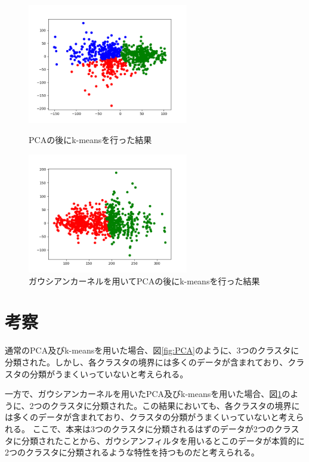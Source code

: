 \documentclass[a4paper,11pt]{jsarticle}
\begin{document}
\begin{figure}[h]
  \begin{minipage}
    {0.5\hsize}
    \begin{center}
      \includegraphics[width=7cm]{pca_and_kmeans.png}
    \end{center}
    \caption{PCAの後にk-meansを行った結果}
    \label{fig:PCA}
  \end{minipage}
  \begin{minipage}
    {0.5\hsize}
    \begin{center}
      \includegraphics[width=7cm]{kernel_pca_and_kmeans.png}
    \end{center}
    \caption{ガウシアンカーネルを用いてPCAの後にk-meansを行った結果}
    \label{fig:PCA_gaussian}
  \end{minipage}
\end{figure}

\section{考察}
通常のPCA及びk-meansを用いた場合、図\ref{fig:PCA}のように、3つのクラスタに分類された。しかし、各クラスタの境界には多くのデータが含まれており、クラスタの分類がうまくいっていないと考えられる。

一方で、ガウシアンカーネルを用いたPCA及びk-meansを用いた場合、図\ref{fig:PCA_gaussian}のように、2つのクラスタに分類された。この結果においても、各クラスタの境界には多くのデータが含まれており、クラスタの分類がうまくいっていないと考えられる。
ここで、本来は3つのクラスタに分類されるはずのデータが2つのクラスタに分類されたことから、ガウシアンフィルタを用いるとこのデータが本質的に2つのクラスタに分類されるような特性を持つものだと考えられる。
\end{document}
